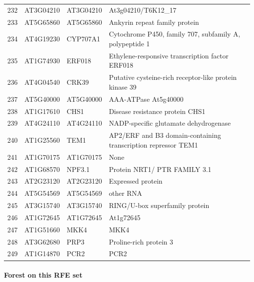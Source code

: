 \documentclass[11pt]{article}
\begin{document}
\begin{center}
\begin{tabular}{rlll}
232 & AT3G04210 & AT3G04210 & At3g04210/T6K12\_17\\
233 & AT5G65860 & AT5G65860 & Ankyrin repeat family protein\\
234 & AT4G19230 & CYP707A1 & Cytochrome P450, family 707, subfamily A, polypeptide 1\\
235 & AT1G74930 & ERF018 & Ethylene-responsive transcription factor ERF018\\
236 & AT4G04540 & CRK39 & Putative cysteine-rich receptor-like protein kinase 39\\
237 & AT5G40000 & AT5G40000 & AAA-ATPase At5g40000\\
238 & AT1G17610 & CHS1 & Disease resistance protein CHS1\\
239 & AT4G24110 & AT4G24110 & NADP-specific glutamate dehydrogenase\\
240 & AT1G25560 & TEM1 & AP2/ERF and B3 domain-containing transcription repressor TEM1\\
241 & AT1G70175 & AT1G70175 & None\\
242 & AT1G68570 & NPF3.1 & Protein NRT1/ PTR FAMILY 3.1\\
243 & AT2G23120 & AT2G23120 & Expressed protein\\
244 & AT5G54569 & AT5G54569 & other RNA\\
245 & AT3G15740 & AT3G15740 & RING/U-box superfamily protein\\
246 & AT1G72645 & AT1G72645 & At1g72645\\
247 & AT1G51660 & MKK4 & MKK4\\
248 & AT3G62680 & PRP3 & Proline-rich protein 3\\
249 & AT1G14870 & PCR2 & PCR2\\
\end{tabular}
\end{center}


\paragraph{Forest on this RFE set}
\label{sec:org357075a}
\end{document}
